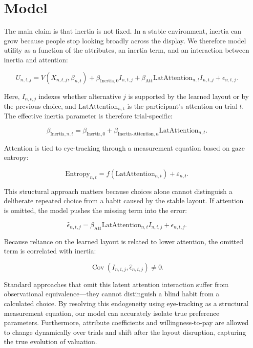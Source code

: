 \section*{Model}

The main claim is that inertia is not fixed. In a stable environment, inertia can grow because people stop looking broadly across the display. We therefore model utility as a function of the attributes, an inertia term, and an interaction between inertia and attention:

\begin{equation}
U_{n,t,j} =
V(X_{n,t,j}, \beta_{n,t})
+ \beta_{\text{Inertia},0} I_{n,t,j}
+ \beta_{\text{Att}} \text{LatAttention}_{n,t} I_{n,t,j}
+ \epsilon_{n,t,j}.
\end{equation}

Here, $I_{n,t,j}$ indexes whether alternative $j$ is supported by the learned layout or by the previous choice, and $\text{LatAttention}_{n,t}$ is the participant's attention on trial $t$. The effective inertia parameter is therefore trial-specific:

\begin{equation}
\beta_{\text{Inertia},n,t} =
\beta_{\text{Inertia},0}
+ \beta_{\text{Inertia-Attention},n}
\text{LatAttention}_{n,t}.
\end{equation}

Attention is tied to eye-tracking through a measurement equation based on gaze entropy:

\begin{equation}
\text{Entropy}_{n,t} =
f(\text{LatAttention}_{n,t}) + \varepsilon_{n,t}.
\end{equation}

This structural approach matters because choices alone cannot distinguish a deliberate repeated choice from a habit caused by the stable layout. If attention is omitted, the model pushes the missing term into the error:

\begin{equation}
\hat{\epsilon}_{n,t,j} =
\beta_{\text{Att}} \text{LatAttention}_{n,t} I_{n,t,j}
+ \epsilon_{n,t,j}.
\end{equation}

Because reliance on the learned layout is related to lower attention, the omitted term is correlated with inertia:

\begin{equation}
\operatorname{Cov}(I_{n,t,j}, \hat{\epsilon}_{n,t,j}) \neq 0.
\end{equation}

Standard approaches that omit this latent attention interaction suffer from observational equivalence—they cannot distinguish a blind habit from a calculated choice. By resolving this endogeneity using eye-tracking as a structural measurement equation, our model can accurately isolate true preference parameters. Furthermore, attribute coefficients and willingness-to-pay are allowed to change dynamically over trials and shift after the layout disruption, capturing the true evolution of valuation.
